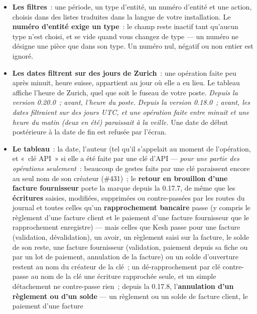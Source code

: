 \documentclass[a4paper,11pt,oneside]{article}
\begin{document}
\begin{itemize}
    \item \textbf{Les filtres}~: une période, un type d'entité, un numéro d'entité et une action,
          choisis dans des listes traduites dans la langue de votre installation. Le
          \textbf{numéro d'entité exige un type}~: le champ reste inactif tant qu'aucun type n'est
          choisi, et se vide quand vous changez de type --- un numéro ne désigne une pièce que dans
          son type. Un numéro nul, négatif ou non entier est ignoré.
    \item \textbf{Les dates filtrent sur des jours de Zurich}~: une opération faite peu après
          minuit, heure suisse, appartient au jour où elle a eu lieu. Le tableau affiche l'heure de
          Zurich, quel que soit le fuseau de votre poste. \emph{Depuis la version 0.20.0~; avant,
          l'heure du poste.} \emph{Depuis la version 0.18.0~; avant, les dates filtraient sur des
          jours UTC, et une opération faite entre minuit et une heure du matin (deux en été)
          paraissait à la veille.} Une date de
          début postérieure à la date de fin est refusée par l'écran.
    \item \textbf{Le tableau}~: la date, l'auteur (tel qu'il s'appelait au moment de l'opération,
          et «~clé API~» si elle a été faite par une clé d'API --- \emph{pour une partie des
          opérations seulement}~: beaucoup de gestes faits par une clé paraissent encore au seul
          nom de son créateur (\#431)~; le \textbf{retour en brouillon d'une facture fournisseur}
          porte la marque depuis la 0.17.7, de même que les \textbf{écritures} saisies, modifiées,
          supprimées ou contre-passées par les routes du journal et toutes celles qu'un
          \textbf{rapprochement bancaire} passe (y compris le règlement d'une facture client et
          le paiement d'une facture fournisseur que le rapprochement enregistre) --- mais celles
          que Kesh passe pour une facture (validation, dévalidation), un avoir, un règlement
          saisi sur la facture, le solde de son reste, une facture fournisseur (validation,
          paiement depuis sa fiche ou par un lot de paiement, annulation de la facture) ou un
          solde d'ouverture restent au nom du créateur de la clé~; un dé-rapprochement par clé
          contre-passe au nom de la clé une écriture rapprochée seule, et un simple détachement
          ne contre-passe rien~; depuis la 0.17.8, l'\textbf{annulation d'un règlement ou d'un
          solde} --- un règlement ou un solde de facture client, le paiement d'une facture

\end{itemize}
\end{document}
